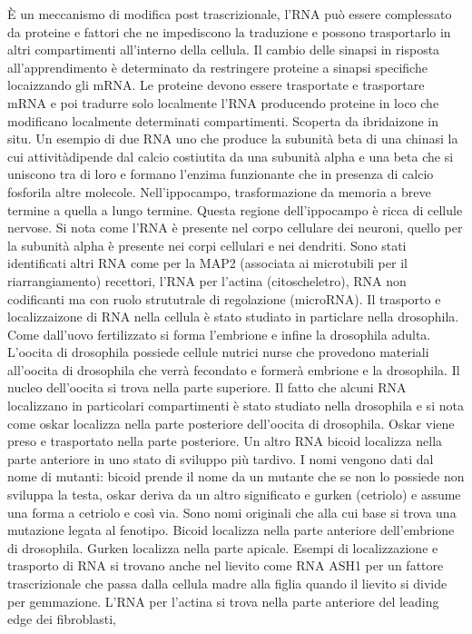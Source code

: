 \`E un meccanismo di modifica post trascrizionale, l'RNA pu\`o essere complessato da proteine e fattori che ne impediscono la traduzione e possono trasportarlo in altri compartimenti 
all'interno della cellula. Il cambio delle sinapsi in risposta all'apprendimento \`e determinato da restringere proteine a sinapsi specifiche locaizzando gli mRNA. Le proteine devono
essere trasportate e trasportare mRNA e poi tradurre solo localmente l'RNA producendo proteine in loco che modificano localmente determinati compartimenti. Scoperta da ibridaizone in 
situ. Un esempio di due RNA uno che produce la subunit\`a beta di una chinasi la cui attivit\` adipende dal calcio costiutita da una subunit\`a alpha e una beta che si uniscono tra
di loro e formano l'enzima funzionante che in presenza di calcio fosforila altre molecole. Nell'ippocampo, trasformazione da memoria a breve termine a quella a lungo termine. Questa 
regione dell'ippocampo \`e ricca di cellule nervose. Si nota come l'RNA \`e presente nel corpo cellulare dei neuroni, quello per la subunit\`a alpha \`e presente nei corpi cellulari e 
nei dendriti. Sono stati identificati altri RNA come per la MAP2 (associata ai microtubili per il riarrangiamento) recettori, l'RNA per l'actina (citoscheletro), RNA non codificanti ma
con ruolo strututrale di regolazione (microRNA). Il trasporto e localizzaizone di RNA nella cellula \`e stato studiato in particlare nella drosophila. Come dall'uovo fertilizzato si 
forma l'embrione e infine la drosophila adulta. L'oocita di drosophila possiede cellule nutrici nurse che provedono materiali all'oocita di drosophila che verr\`a fecondato e former\`a
embrione e la drosophila. Il nucleo dell'oocita si trova nella parte superiore. Il fatto che alcuni RNA localizzano in particolari compartimenti \`e stato studiato nella drosophila e 
si nota come oskar localizza nella parte posteriore dell'oocita di drosophila. Oskar viene preso e trasportato nella parte posteriore. Un altro RNA bicoid localizza nella parte anteriore
in uno stato di sviluppo pi\`u tardivo. I nomi vengono dati dal nome di mutanti: bicoid prende il nome da un mutante che se non lo possiede non sviluppa la testa, oskar deriva da un
altro significato e gurken (cetriolo) e assume una forma a cetriolo e cos\`i via. Sono nomi originali che alla cui base si trova una mutazione legata al fenotipo. Bicoid localizza nella
parte anteriore dell'embrione di drosophila. Gurken localizza nella parte apicale. Esempi di localizzazione e trasporto di RNA si trovano anche nel lievito come RNA ASH1 per un fattore 
trascrizionale che passa dalla cellula madre alla figlia quando il lievito si divide per gemmazione. L'RNA per l'actina si trova nella parte anteriore del leading edge dei fibroblasti, 
